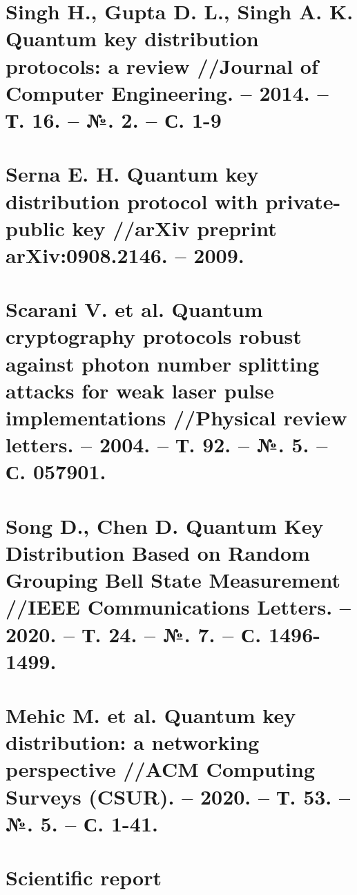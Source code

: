 \clearpage
\section{Singh H., Gupta D. L., Singh A. K. Quantum key distribution protocols: a review //Journal of Computer Engineering. – 2014. – Т. 16. – №. 2. – С. 1-9 }


\clearpage
\section{Serna E. H. Quantum key distribution protocol with private-public key //arXiv preprint arXiv:0908.2146. – 2009. }


\clearpage
\section{Scarani V. et al. Quantum cryptography protocols robust against photon number splitting attacks for weak laser pulse implementations //Physical review letters. – 2004. – Т. 92. – №. 5. – С. 057901. }


\clearpage
\section{Song D., Chen D. Quantum Key Distribution Based on Random Grouping Bell State Measurement //IEEE Communications Letters. – 2020. – Т. 24. – №. 7. – С. 1496-1499. }


%

\clearpage
\section{Mehic M. et al. Quantum key distribution: a networking perspective //ACM Computing Surveys (CSUR). – 2020. – Т. 53. – №. 5. – С. 1-41. }


\clearpage
\section{Scientific report}

